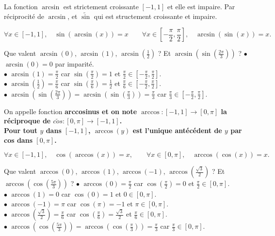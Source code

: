\documentclass[11pt]{article}
\begin{document}
\begin{prop}{}{}
    La fonction $\arcsin$ est strictement croissante $[-1,1]$ et elle est impaire.
    \tcblower
    Par réciprocité de $\arcsin$, et $\tilde{\sin}$ qui est structement croissante et impaire.
\end{prop}

\begin{prop}{}{}
    \begin{equation*}
        \forall x \in [-1,1],\quad \sin(\arcsin(x))=x\qquad\forall x\in[-\frac{\pi}{2},\frac{\pi}{2}],\quad\arcsin(\sin(x))=x.
    \end{equation*}
\end{prop}

\begin{ex}{}{}
    Que valent $\arcsin(0)$, $\arcsin(1)$, $\arcsin(\frac{1}{2})$ ? Et $\arcsin(\sin(\frac{2\pi}{3}))$ ?
    \tcblower
    $\bullet$ $\arcsin(0)=0$ par imparité.\\
    $\bullet$ $\arcsin(1)=\frac{\pi}{2}$ car $\sin(\frac{\pi}{2})=1$ et $\frac{\pi}{2}\in[-\frac{\pi}{2},\frac{\pi}{2}]$.\\
    $\bullet$ $\arcsin(\frac{1}{2})=\frac{\pi}{6}$ car $\sin(\frac{\pi}{6})=\frac{1}{2}$ et $\frac{\pi}{6}\in[-\frac{\pi}{2},\frac{\pi}{2}]$.\\
    $\bullet$ $\arcsin(\sin(\frac{2\pi}{3}))=\arcsin(\sin(\frac{\pi}{3}))=\frac{\pi}{3}$ car $\frac{\pi}{3}\in[-\frac{\pi}{2},\frac{\pi}{2}]$.
\end{ex}

\begin{defi}{}{}
    On appelle fonction \bf{arccosinus} et on note $\arccos:[-1,1]\to[0,\pi]$ la réciproque de $\tilde{cos}:[0,\pi]\to[-1,1]$.\\
    Pour tout $y$ dans $[-1,1]$, $\arccos(y)$ est l'unique antécédent de $y$ par cos dans $[0,\pi]$.
\end{defi}

\begin{prop}{}{}
    \begin{equation*}
        \forall x \in [-1,1],\quad\cos(\arccos(x))=x,\qquad\forall x\in[0,\pi],\quad\arccos(\cos(x))=x.
    \end{equation*}
\end{prop}

\begin{ex}{}{}
    Que valent $\arccos(0)$, $\arccos(1)$, $\arccos(-1)$, $\arccos(\frac{\sqrt{3}}{2})$ ? Et $\arccos(\cos(\frac{5\pi}{3}))$ ?
    \tcblower
    $\bullet$ $\arccos(0)=\frac{\pi}{2}$ car $\cos(\frac{\pi}{2})=0$ et $\frac{\pi}{2}\in[0,\pi]$.\\
    $\bullet$ $\arccos(1)=0$ car $\cos(0)=1$ et $0\in[0,\pi]$.\\
    $\bullet$ $\arccos(-1)=\pi$ car $\cos(\pi)=-1$ et $\pi\in[0,\pi]$.\\
    $\bullet$ $\arccos(\frac{\sqrt{3}}{2})=\frac{\pi}{6}$ car $\cos(\frac{\pi}{6})=\frac{\sqrt{3}}{2}$ et $\frac{\pi}{6}\in[0,\pi]$.\\
    $\bullet$ $\arccos(\cos(\frac{5\pi}{3}))=\arccos(\cos(\frac{\pi}{3}))=\frac{\pi}{3}$ car $\frac{\pi}{3}\in[0,\pi]$.
\end{ex}
\end{document}
